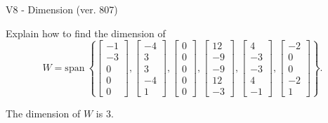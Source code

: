 \begin{exercise}
  \begin{exerciseTitle}V8 - Dimension (ver. 807)\end{exerciseTitle}
  \begin{exerciseStatement}
    Explain how to find the dimension of 
\[W=\mathrm{span}\ \left\{\left[\begin{array}{r}
-1 \\
-3 \\
0 \\
0 \\
0
\end{array}\right] , \left[\begin{array}{r}
-4 \\
3 \\
3 \\
-4 \\
1
\end{array}\right] , \left[\begin{array}{r}
0 \\
0 \\
0 \\
0 \\
0
\end{array}\right] , \left[\begin{array}{r}
12 \\
-9 \\
-9 \\
12 \\
-3
\end{array}\right] , \left[\begin{array}{r}
4 \\
-3 \\
-3 \\
4 \\
-1
\end{array}\right] , \left[\begin{array}{r}
-2 \\
0 \\
0 \\
-2 \\
1
\end{array}\right]\right\}.\]



  \end{exerciseStatement}
  \begin{exerciseAnswer}
   The dimension of \(W\) is  \(3\).
  


  \end{exerciseAnswer}
\end{exercise}